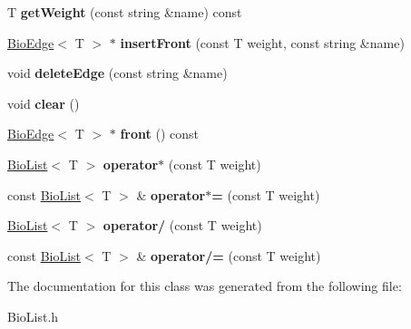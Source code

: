 \begin{DoxyCompactItemize}
T {\bfseries get\+Weight} (const string \&name) const
\item 
\mbox{\label{class_bio_list_ac9accab38adbb61f19fc8b362fe3ba6e}} 
\hyperlink{class_bio_edge}{Bio\+Edge}$<$ T $>$ $\ast$ {\bfseries insert\+Front} (const T weight, const string \&name)
\item 
\mbox{\label{class_bio_list_aa5ade1fd7d850d3c66b0af9624bc48f7}} 
void {\bfseries delete\+Edge} (const string \&name)
\item 
\mbox{\label{class_bio_list_a80f4d2798831289a23b0e7f59b146803}} 
void {\bfseries clear} ()
\item 
\mbox{\label{class_bio_list_a771e384f336e4a60a166f11e7e104455}} 
\hyperlink{class_bio_edge}{Bio\+Edge}$<$ T $>$ $\ast$ {\bfseries front} () const
\item 
\mbox{\label{class_bio_list_a90e98530b5614fa49f19cef2fbcfd75f}} 
\hyperlink{class_bio_list}{Bio\+List}$<$ T $>$ {\bfseries operator$\ast$} (const T weight)
\item 
\mbox{\label{class_bio_list_a5c146c21b1474fa4e6a99a27ce5722a8}} 
const \hyperlink{class_bio_list}{Bio\+List}$<$ T $>$ \& {\bfseries operator$\ast$=} (const T weight)
\item 
\mbox{\label{class_bio_list_a55385168b85f8a34715d2c03a1fe4a3b}} 
\hyperlink{class_bio_list}{Bio\+List}$<$ T $>$ {\bfseries operator/} (const T weight)
\item 
\mbox{\label{class_bio_list_a551599a405b18e3e2987f8c04a8a68c8}} 
const \hyperlink{class_bio_list}{Bio\+List}$<$ T $>$ \& {\bfseries operator/=} (const T weight)
\end{DoxyCompactItemize}


The documentation for this class was generated from the following file\+:\begin{DoxyCompactItemize}
\item 
Bio\+List.\+h\end{DoxyCompactItemize}
